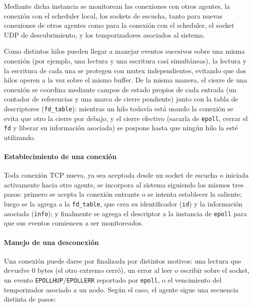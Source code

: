 \documentclass[a4paper,10pt]{article}
\begin{document}
\noindent Mediante dicha instancia se monitorean las conexiones con otros agentes, la conexión con el scheduler local, los sockets de escucha, tanto para nuevas conexiones de otros agentes como para la conexión con el scheduler, el socket UDP de descubrimiento, y los temporizadores asociados al sistema.

\noindent Como distintos hilos pueden llegar a manejar eventos sucesivos sobre una misma conexión (por
ejemplo, una lectura y una escritura casi simultáneas), la lectura y la escritura de cada una se
protegen con mutex independientes, evitando que dos hilos operen a la vez sobre el mismo buffer.
De la misma manera, el cierre de una conexión se coordina mediante campos de estado propios de
cada entrada (un contador de referencias y una marca de cierre pendiente) junto con la tabla de
descriptores (\texttt{fd\_table}): mientras un hilo todavía está usando la conexión se evita que
otro la cierre por debajo, y el cierre efectivo (sacarla de \texttt{epoll}, cerrar el \texttt{fd}
y liberar su información asociada) se pospone hasta que ningún hilo la esté utilizando.

\paragraph{Establecimiento de una conexión}

Toda conexión TCP nueva, ya sea aceptada desde un socket de escucha o iniciada activamente hacia
otro agente, se incorpora al sistema siguiendo los mismos tres pasos: primero se acepta la
conexión entrante o se intenta establecer la saliente; luego se la agrega a la \texttt{fd\_table},
que crea su identificador (\texttt{id}) y la información asociada (\texttt{info}); y finalmente se
agrega el descriptor a la instancia de \texttt{epoll} para que sus eventos comiencen a ser
monitoreados.

\paragraph{Manejo de una desconexión}

Una conexión puede darse por finalizada por distintos motivos: una lectura que devuelve 0 bytes
(el otro extremo cerró), un error al leer o escribir sobre el socket, un evento
\texttt{EPOLLHUP}/\texttt{EPOLLERR} reportado por \texttt{epoll}, o el vencimiento del temporizador
asociado a un nodo. Según el caso, el agente sigue una secuencia distinta de pasos:
\end{document}
